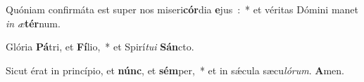 ﻿\item Quóniam confirmáta est super nos miseri\textbf{cór}dia \textbf{e}jus~:~* et véritas Dómini manet \emph{in} \emph{æ}\textbf{tér}num.
\item Glória \textbf{Pá}tri, et \textbf{Fí}\-lio,~* et Spirí\emph{tu}\emph{i} \textbf{Sán}cto.
\item Sicut érat in princípio, et \textbf{núnc}, et \textbf{sém}\-per,~* et in sǽcula sæcu\emph{ló}\emph{rum}. \textbf{A}men.